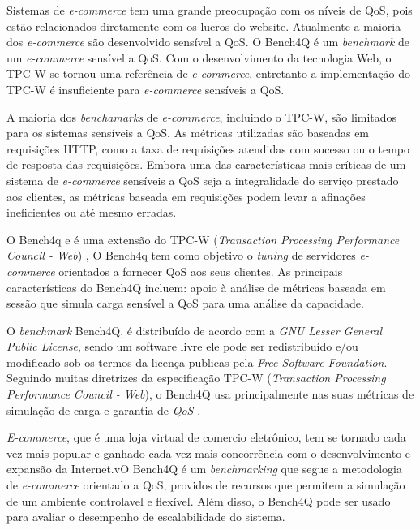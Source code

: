 
Sistemas de \textit{e-commerce} tem uma grande preocupação com os níveis de QoS, pois estão relacionados diretamente com os lucros do website. Atualmente a maioria dos \textit{e-commerce} são desenvolvido sensível a QoS. O Bench4Q é um \textit{benchmark} de um \textit{e-commerce} sensível a QoS.  Com o desenvolvimento da tecnologia Web, o TPC-W se tornou uma referência de \textit{e-commerce}, entretanto a implementação do TPC-W é insuficiente para \textit{e-commerce} sensíveis a QoS.

A maioria dos \textit{benchamarks} de \textit{e-commerce}, incluindo o TPC-W, são limitados para os sistemas sensíveis a QoS. As métricas utilizadas são baseadas em requisições HTTP, como a taxa de requisições atendidas com sucesso ou o tempo de resposta das requisições. Embora uma das características mais críticas de um sistema de \textit{e-commerce} sensíveis a QoS seja a integralidade do serviço prestado aos clientes, as métricas baseada em requisições podem levar a afinações ineficientes ou até mesmo erradas.


O Bench4q e é uma extensão do TPC-W (\textit{Transaction Processing Performance Council - Web})
\cite{Menasce2002}, O Bench4q tem como objetivo o \textit{tuning} de servidores \textit{e-commerce} orientados a fornecer QoS aos seus clientes. As principais características do Bench4Q incluem: 
apoio à análise de métricas baseada em sessão que simula carga sensível a QoS para uma análise da capacidade. 

O \textit{benchmark} Bench4Q, é distribuído de acordo com a \textit{GNU Lesser General Public License}, sendo um software livre ele pode ser redistribuído e/ou modificado sob os termos da licença publicas pela \textit{Free Software Foundation}. Seguindo muitas diretrizes da especificação TPC-W (\textit{Transaction Processing Performance Council - Web}), o Bench4Q usa principalmente nas suas métricas de simulação de carga e garantia de \textit{QoS} \cite{Bench4Q}. 

\textit{E-commerce}, que é uma loja virtual de comercio eletrônico, tem se tornado cada vez mais popular e ganhado cada vez mais concorrência com o desenvolvimento e expansão da Internet.vO Bench4Q é um \textit{benchmarking} que segue a metodologia de \textit{e-commerce} orientado a QoS, providos de recursos que permitem a simulação de um ambiente controlavel e flexível. Além disso, o Bench4Q pode ser usado para avaliar o desempenho de escalabilidade do sistema.

